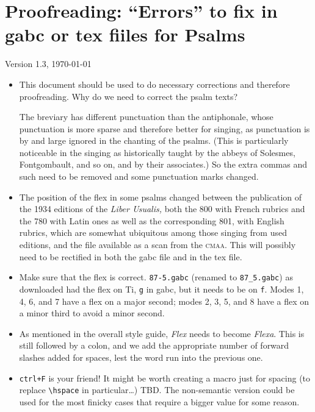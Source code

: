 \documentclass[11pt]{article}
\begin{document}
 \section{Proofreading: ``Errors'' to fix in gabc or tex fiiles for Psalms}
 
 {\centering Version 1.3, \today\par}
 
\begin{itemize}
 \item
 This document should be used to do necessary corrections and therefore proofreading. Why do we need to correct the psalm texts?
 
The breviary has different punctuation than the antiphonale, whose punctuation is more sparse and therefore better for singing, as punctuation is by and large ignored in the chanting of the psalms. (This is particularly noticeable in the singing as historically taught by the abbeys of Solesmes, Fontgombault, and so on, and by their associates.) So the extra commas and such need to be removed and some punctuation marks changed.
 
 \item
 The position of the flex in some psalms changed between the publication of the 1934 editions of the \textit{Liber Usualis,} both the 800 with French rubrics and the 780 with Latin ones as well as the corresponding 801, with English rubrics, which are somewhat ubiquitous among those singing from used editions, and the file available as a scan from the \textsc{cmaa}. This will possibly need to be rectified in both the gabc file and in the tex file.
 
 \item
 
 Make sure that the flex is correct. \verb|87-5.gabc| (renamed to \verb|87_5.gabc|) as downloaded had the flex on Ti, \verb|g| in gabc, but it needs to be on \verb|f|. Modes 1, 4, 6, and 7 have a flex on a major second; modes 2, 3, 5, and 8 have a flex on a minor third to avoid a minor second.

 \item
 As mentioned in the overall style guide, \textit{Flex} needs to become \textit{Flexa}. This is still followed by a colon, and we add the appropriate number of forward slashes added for spaces, lest the word run into the previous one. 

 \item
\texttt{ctrl+F} is your friend! It might be worth creating a macro just for spacing (to replace \verb|\hspace| in particular…) TBD. The non-semantic version could be used for the most finicky cases that require a bigger value for some reason.


\end{itemize}
\end{document}
